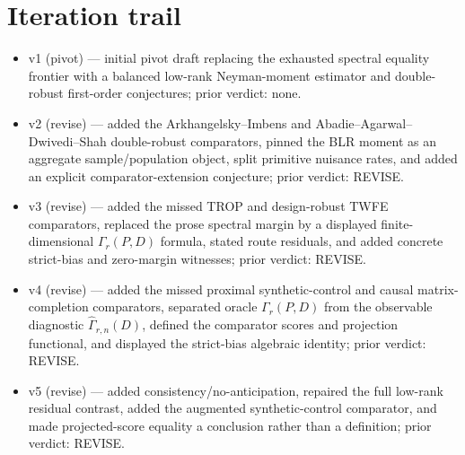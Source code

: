 \documentclass[11pt]{article}
\theoremstyle{definition}
\theoremstyle{plain}
\theoremstyle{remark}
\begin{document}
\section{Iteration trail}
\begin{itemize}[leftmargin=*]
\item v1 (pivot) --- initial pivot draft replacing the exhausted spectral
equality frontier with a balanced low-rank Neyman-moment estimator and
double-robust first-order conjectures; prior verdict: none.
\item v2 (revise) --- added the Arkhangelsky--Imbens and Abadie--Agarwal--
Dwivedi--Shah double-robust comparators, pinned the BLR moment as an aggregate
sample/population object, split primitive nuisance rates, and added an explicit
comparator-extension conjecture; prior verdict: REVISE.
\item v3 (revise) --- added the missed TROP and design-robust TWFE comparators,
replaced the prose spectral margin by a displayed finite-dimensional
$\Gamma_r(P,D)$ formula, stated route residuals, and added concrete strict-bias
and zero-margin witnesses; prior verdict: REVISE.
\item v4 (revise) --- added the missed proximal synthetic-control and causal
matrix-completion comparators, separated oracle $\Gamma_r(P,D)$ from the
observable diagnostic $\widehat\Gamma_{r,n}(D)$, defined the comparator scores
and projection functional, and displayed the strict-bias algebraic identity;
prior verdict: REVISE.
\item v5 (revise) --- added consistency/no-anticipation, repaired the full
low-rank residual contrast, added the augmented synthetic-control comparator,
and made projected-score equality a conclusion rather than a definition; prior
verdict: REVISE.
\end{itemize}
\end{document}
